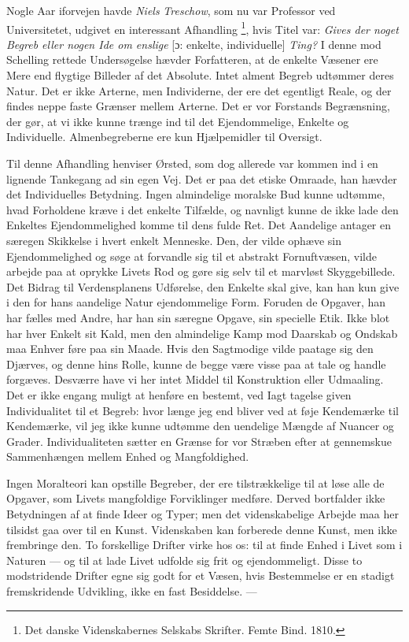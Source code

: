 \documentclass[12pt,a4paper,openany]{book}
\newcommand{\opage}[1]{\marginnote{\footnotesize\textit{[#1]}}}
\begin{document}
Nogle Aar iforvejen havde \emph{Niels} \emph{Treschow}, som nu var Professor
ved Universitetet, udgivet en interessant Afhandling%
\footnote[1]{Det danske Videnskabernes Selskabs Skrifter. Femte Bind. 1810.},
hvis Titel var: \textit{Gives der noget Begreb eller nogen Ide om enslige} [ɔ:
enkelte, individuelle] \textit{Ting?} I denne mod Schelling rettede
Undersøgelse hævder Forfatteren, at de enkelte Væsener ere Mere end flygtige
Billeder af det Absolute. Intet alment Begreb udtømmer deres Natur. Det er ikke
Arterne, men Individerne, der ere det egentligt Reale, og der findes neppe
faste Grænser mellem Arterne. Det er vor Forstands Begrænsning, der gør, at vi
ikke kunne trænge ind til det Ejendommelige, Enkelte og Individuelle.
Almenbegreberne ere kun Hjælpemidler til Oversigt.

Til denne Afhandling henviser Ørsted, som dog allerede var kommen ind i en
lignende Tankegang ad sin egen Vej. Det er paa det etiske Omraade, han hævder
det Individuelles Betydning. Ingen almindelige moralske Bud kunne udtømme, hvad
Forholdene kræve i det enkelte Tilfælde, og navnligt kunne de ikke lade den
Enkeltes Ejendommelighed komme til dens fulde Ret. Det Aandelige antager en
særegen Skikkelse i hvert enkelt Menneske. Den, der vilde ophæve sin
Ejendommelighed og søge at forvandle sig til et abstrakt Fornuftvæsen, vilde
arbejde paa at oprykke Livets Rod og gøre sig selv til et marvløst
Skyggebillede. Det Bidrag til Verdensplanens Udførelse, den Enkelte skal give,
kan han kun give i den for hans aandelige Natur ejendommelige Form. Foruden de
Opgaver, han har fælles med Andre, har han sin særegne Opgave, sin specielle
Etik. Ikke blot har hver Enkelt sit Kald, men den almindelige Kamp mod Daarskab
og Ondskab maa Enhver føre paa sin Maade. Hvis den Sagtmodige vilde paatage sig
den Djærves, og denne hins Rolle, kunne de begge være visse paa at tale og
handle forgæves. Desværre have vi her intet Middel til Konstruktion eller
Udmaaling. Det er ikke engang muligt at henføre en bestemt, ved Iagt%
\setcounter{footnote}{0}%
\opage{79}tagelse given Individualitet til et Begreb: hvor længe jeg end bliver
ved at føje Kendemærke til Kendemærke, vil jeg ikke kunne udtømme den uendelige
Mængde af Nuancer og Grader. Individualiteten sætter en Grænse for vor Stræben
efter at gennemskue Sammenhængen mellem Enhed og Mangfoldighed.

Ingen Moralteori kan opstille Begreber, der ere tilstrækkelige til at løse alle
de Opgaver, som Livets mangfoldige Forviklinger medføre. Derved bortfalder ikke
Betydningen af at finde Ideer og Typer; men det videnskabelige Arbejde maa her
tilsidst gaa over til en Kunst. Videnskaben kan forberede denne Kunst, men ikke
frembringe den. To forskellige Drifter virke hos os: til at finde Enhed i Livet
som i Naturen --- og til at lade Livet udfolde sig frit og ejendommeligt. Disse
to modstridende Drifter egne sig godt for et Væsen, hvis Bestemmelse er en
stadigt fremskridende Udvikling, ikke en fast Besiddelse. ---
\end{document}
